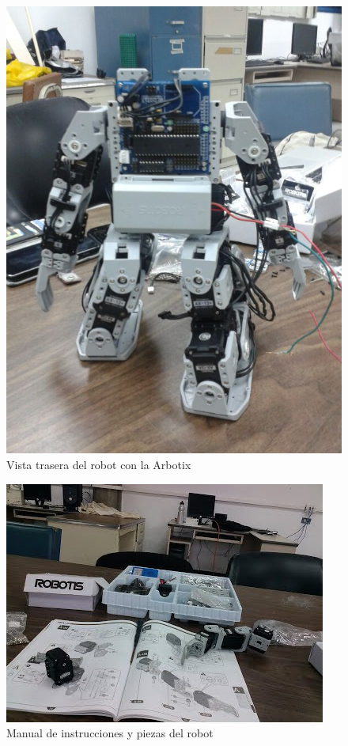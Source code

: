 \begin{figure}[hbtp]
\centering
\includegraphics[scale=0.3]{imagenes/traseroDeJunny.jpg}
\caption{Vista trasera del robot con la Arbotix}
\label{fig:trasera2}
\end{figure}

\begin{figure}[hbtp]
\centering
\includegraphics[scale=0.7]{imagenes/CIMG0225.jpg}
\caption{Manual de instrucciones y piezas del robot}
\end{figure}

